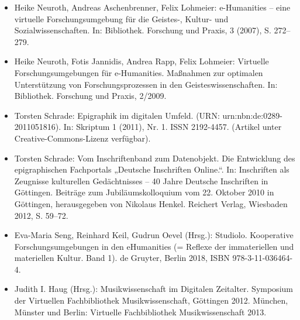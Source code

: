 \documentclass{article}
\begin{document}
\begin{itemize}
\item Heike Neuroth, Andreas Aschenbrenner, Felix Lohmeier: e-Humanities – eine virtuelle Forschungsumgebung für die Geistes-, Kultur- und Sozialwissenschaften. In: Bibliothek. Forschung und Praxis, 3 (2007), S. 272–279.
\item Heike Neuroth, Fotis Jannidis, Andrea Rapp, Felix Lohmeier: Virtuelle Forschungsumgebungen für e-Humanities. Maßnahmen zur optimalen Unterstützung von Forschungsprozessen in den Geisteswissenschaften. In: Bibliothek. Forschung und Praxis, 2/2009.
\item Torsten Schrade: Epigraphik im digitalen Umfeld. (URN: urn:nbn:de:0289-2011051816). In: Skriptum 1 (2011), Nr. 1. ISSN 2192-4457. (Artikel unter Creative-Commons-Lizenz verfügbar).
\item Torsten Schrade: Vom Inschriftenband zum Datenobjekt. Die Entwicklung des epigraphischen Fachportals „Deutsche Inschriften Online.“. In: Inschriften als Zeugnisse kulturellen Gedächtnisses – 40 Jahre Deutsche Inschriften in Göttingen. Beiträge zum Jubiläumskolloquium vom 22. Oktober 2010 in Göttingen, herausgegeben von Nikolaus Henkel. Reichert Verlag, Wiesbaden 2012, S. 59–72.
\item Eva-Maria Seng, Reinhard Keil, Gudrun Oevel (Hrsg.): Studiolo. Kooperative Forschungsumgebungen in den eHumanities (= Reflexe der immateriellen und materiellen Kultur. Band 1). de Gruyter, Berlin 2018, ISBN 978-3-11-036464-4.
\item Judith I. Haug (Hrsg.): Musikwissenschaft im Digitalen Zeitalter. Symposium der Virtuellen Fachbibliothek Musikwissenschaft, Göttingen 2012. München, Münster und Berlin: Virtuelle Fachbibliothek Musikwissenschaft 2013.
\end{itemize}
\end{document}
